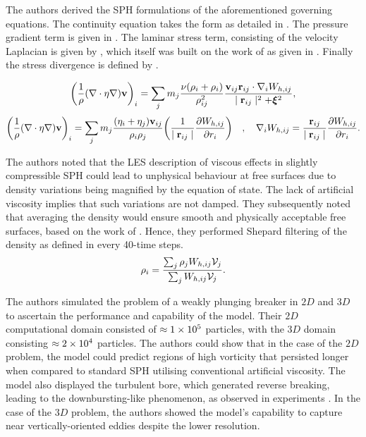 The authors derived the SPH formulations of the aforementioned governing equations. The continuity equation takes the form as detailed in . The pressure gradient term is given in . The laminar stress term, consisting of the velocity Laplacian is given by , which itself was built on the work of \cite{morris1997modeling} as given in . Finally the stress divergence is defined by .

\begin{equation}
    \bigg( \frac{1}{\rho} (\nabla \cdot \eta \nabla) \vect{v} \bigg)_i = \sum_j m_j \frac{\nu (\rho_i + \rho_i)}{\rho_{ij}^2} \frac{\VIJ \RIJ \cdot \DWIJ}{\RtwoIJ + \MachineEpsilon^2},
    \label{eq:ROGERS2005-vel-laplacian-sph}
\end{equation}
\begin{equation}
    \bigg( \frac{1}{\rho} (\nabla \cdot \eta \nabla) \vect{v} \bigg)_i = \sum_j m_j \frac{(\eta_i + \eta_j) \VIJ}{\rho_i \rho_j} \bigg( \frac{1}{\RtwoIJ[]} \PartialDerivative[r_i]{\WIJ} \bigg) \quad , \quad \DWIJ = \frac{\RIJ}{\RtwoIJ[]} \PartialDerivative[r_i]{\WIJ}.
    \label{eq:morris1997modeling-vel-laplacian-sph}
\end{equation}

The authors noted that the LES description of viscous effects in slightly compressible SPH could lead to unphysical behaviour at free surfaces due to density variations being magnified by the equation of state. The lack of artificial viscosity implies that such variations are not damped. They subsequently noted that averaging the density would ensure smooth and physically acceptable free surfaces, based on the work of \cite{panizzo2004physical}. Hence, they performed Shepard filtering of the density as defined in  every 40-time steps.
\begin{equation}
    \rho_i = \frac{\sum_j \rho_j \WIJ \Vol_j}{\sum_j \WIJ \Vol_j}.
    \label{eq:ROGERS2005-rho-shepard-filter}
\end{equation}

The authors simulated the problem of a weakly plunging breaker in $2D$ and $3D$ to ascertain the performance and capability of the model. Their $2D$ computational domain consisted of $\approx 1 \times {10}^{5}$ particles, with the $3D$ domain consisting $\approx 2 \times {10}^{4}$ particles.
The authors could show that in the case of the $2D$ problem, the model could predict regions of high vorticity that persisted longer when compared to standard SPH utilising conventional artificial viscosity. The model also displayed the turbulent bore, which generated reverse breaking, leading to the downbursting-like phenomenon, as observed in experiments \parencite{kubo2001large}.
In the case of the $3D$ problem, the authors showed the model’s capability to capture near vertically-oriented eddies despite the lower resolution. 

